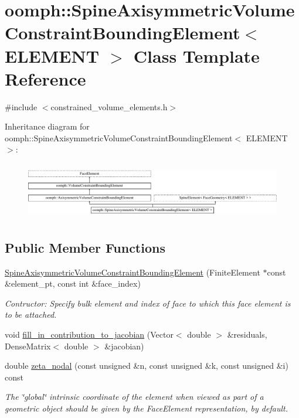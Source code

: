 \hypertarget{classoomph_1_1SpineAxisymmetricVolumeConstraintBoundingElement}{}\section{oomph\+:\+:Spine\+Axisymmetric\+Volume\+Constraint\+Bounding\+Element$<$ E\+L\+E\+M\+E\+NT $>$ Class Template Reference}
\label{classoomph_1_1SpineAxisymmetricVolumeConstraintBoundingElement}


{\ttfamily \#include $<$constrained\+\_\+volume\+\_\+elements.\+h$>$}

Inheritance diagram for oomph\+:\+:Spine\+Axisymmetric\+Volume\+Constraint\+Bounding\+Element$<$ E\+L\+E\+M\+E\+NT $>$\+:\begin{figure}[H]
\begin{center}
\leavevmode
\includegraphics[height=2.505593cm]{classoomph_1_1SpineAxisymmetricVolumeConstraintBoundingElement}
\end{center}
\end{figure}
\subsection*{Public Member Functions}
\begin{DoxyCompactItemize}
\item 
\hyperlink{classoomph_1_1SpineAxisymmetricVolumeConstraintBoundingElement_a5b9c09e04e27442d00950c9bf513657e}{Spine\+Axisymmetric\+Volume\+Constraint\+Bounding\+Element} (Finite\+Element $\ast$const \&element\+\_\+pt, const int \&face\+\_\+index)
\begin{DoxyCompactList}\small\item\em Contructor\+: Specify bulk element and index of face to which this face element is to be attached. \end{DoxyCompactList}\item 
void \hyperlink{classoomph_1_1SpineAxisymmetricVolumeConstraintBoundingElement_a5813860802c0474ef6ff5f249ca7141f}{fill\+\_\+in\+\_\+contribution\+\_\+to\+\_\+jacobian} (Vector$<$ double $>$ \&residuals, Dense\+Matrix$<$ double $>$ \&jacobian)
\item 
double \hyperlink{classoomph_1_1SpineAxisymmetricVolumeConstraintBoundingElement_ae15b2d0563f79ea10d23a1286831143a}{zeta\+\_\+nodal} (const unsigned \&n, const unsigned \&k, const unsigned \&i) const
\begin{DoxyCompactList}\small\item\em The \char`\"{}global\char`\"{} intrinsic coordinate of the element when viewed as part of a geometric object should be given by the Face\+Element representation, by default. \end{DoxyCompactList}\end{DoxyCompactItemize}
